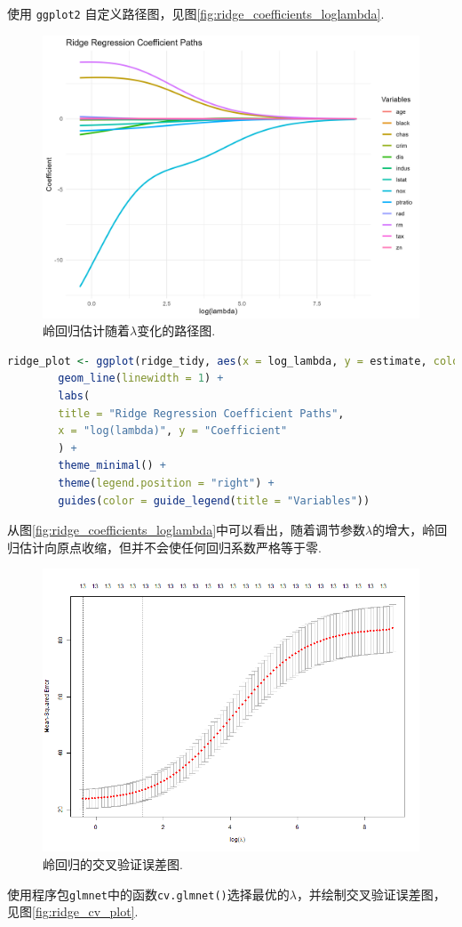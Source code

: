 \documentclass[12pt, a4paper, oneside]{ctexart}
\begin{document}
	使用 \texttt{ggplot2} 自定义路径图，见图\eqref{fig:ridge_coefficients_loglambda}.
	\begin{figure}[H]
		\small
		\centering
		\includegraphics[width=0.75\columnwidth]{../Figure/ridge_coefficients_loglambda.png}
		\caption{岭回归估计随着$\lambda$变化的路径图.}
		\label{fig:ridge_coefficients_loglambda}
	\end{figure}
	\begin{lstlisting}[language=R]
		ridge_plot <- ggplot(ridge_tidy, aes(x = log_lambda, y = estimate, color = term)) +
		geom_line(linewidth = 1) +
		labs(
		title = "Ridge Regression Coefficient Paths",
		x = "log(lambda)", y = "Coefficient"
		) +
		theme_minimal() +
		theme(legend.position = "right") +
		guides(color = guide_legend(title = "Variables"))
	\end{lstlisting}
	
	从图\eqref{fig:ridge_coefficients_loglambda}中可以看出，随着调节参数$\lambda$的增大，岭回归估计向原点收缩，但并不会使任何回归系数严格等于零.				
	
	\begin{figure}[H]
		\small
		\centering
		\includegraphics[width=0.8\columnwidth]{../Figure/ridge_cv_plot.png}
		\caption{岭回归的交叉验证误差图.}
		\label{fig:ridge_cv_plot}
	\end{figure}
	使用程序包\texttt{glmnet}中的函数\texttt{cv.glmnet()}选择最优的$\lambda$，并绘制交叉验证误差图，见图\eqref{fig:ridge_cv_plot}.
	
\end{document}
